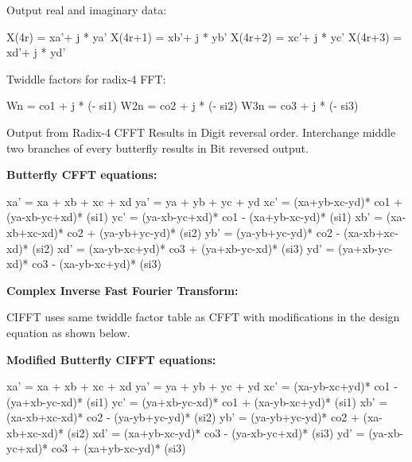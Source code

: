 \begin{DoxyParagraph}{}
Output real and imaginary data\-: 
\begin{DoxyPre}    
  X(4r) = xa'+ j * ya'    
  X(4r+1) = xb'+ j * yb'    
  X(4r+2) = xc'+ j * yc'    
  X(4r+3) = xd'+ j * yd'    
  \end{DoxyPre}
 
\end{DoxyParagraph}
\begin{DoxyParagraph}{}
Twiddle factors for radix-\/4 F\-F\-T\-: 
\begin{DoxyPre}    
  Wn = co1 + j * (- si1)    
  W2n = co2 + j * (- si2)    
  W3n = co3 + j * (- si3)    
  \end{DoxyPre}

\end{DoxyParagraph}
\begin{DoxyParagraph}{}

\end{DoxyParagraph}
\begin{DoxyParagraph}{}
Output from Radix-\/4 C\-F\-F\-T Results in Digit reversal order. Interchange middle two branches of every butterfly results in Bit reversed output. 
\end{DoxyParagraph}
\begin{DoxyParagraph}{}
{\bfseries  Butterfly C\-F\-F\-T equations\-:} 
\begin{DoxyPre}    
  xa' = xa + xb + xc + xd    
  ya' = ya + yb + yc + yd    
  xc' = (xa+yb-xc-yd)* co1 + (ya-xb-yc+xd)* (si1)    
  yc' = (ya-xb-yc+xd)* co1 - (xa+yb-xc-yd)* (si1)    
  xb' = (xa-xb+xc-xd)* co2 + (ya-yb+yc-yd)* (si2)    
  yb' = (ya-yb+yc-yd)* co2 - (xa-xb+xc-xd)* (si2)    
  xd' = (xa-yb-xc+yd)* co3 + (ya+xb-yc-xd)* (si3)    
  yd' = (ya+xb-yc-xd)* co3 - (xa-yb-xc+yd)* (si3)    
  \end{DoxyPre}

\end{DoxyParagraph}
{\bfseries Complex Inverse Fast Fourier Transform\-:} \begin{DoxyParagraph}{}
C\-I\-F\-F\-T uses same twiddle factor table as C\-F\-F\-T with modifications in the design equation as shown below.
\end{DoxyParagraph}
\begin{DoxyParagraph}{}
{\bfseries  Modified Butterfly C\-I\-F\-F\-T equations\-:} 
\begin{DoxyPre}    
  xa' = xa + xb + xc + xd    
  ya' = ya + yb + yc + yd    
  xc' = (xa-yb-xc+yd)* co1 - (ya+xb-yc-xd)* (si1)    
  yc' = (ya+xb-yc-xd)* co1 + (xa-yb-xc+yd)* (si1)    
  xb' = (xa-xb+xc-xd)* co2 - (ya-yb+yc-yd)* (si2)    
  yb' = (ya-yb+yc-yd)* co2 + (xa-xb+xc-xd)* (si2)    
  xd' = (xa+yb-xc-yd)* co3 - (ya-xb-yc+xd)* (si3)    
  yd' = (ya-xb-yc+xd)* co3 + (xa+yb-xc-yd)* (si3)    
  \end{DoxyPre}

\end{DoxyParagraph}
